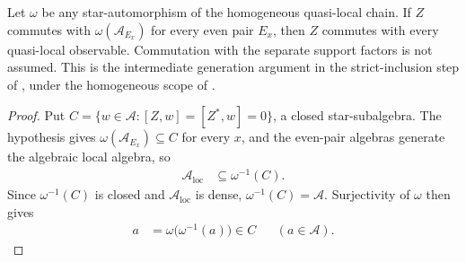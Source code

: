 \begin{lemma}
    \label{lem:qca_even_pair_image_commutant}
    \leanok
    Let $\omega$ be any star-automorphism of the homogeneous quasi-local
    chain. If $Z$ commutes with $\omega(\mathcal A_{E_x})$ for every even
    pair $E_x$, then $Z$ commutes with every quasi-local observable.
    Commutation with the separate support factors is not assumed.
    This is the intermediate generation argument in the strict-inclusion
    step of \cite[lines~1276--1287]{Gross2012IndexTheory}, under the
    homogeneous scope of
    \cite{gap:gnvw12_site_dependent_adjacent_generation_scope}.
\end{lemma}
\begin{proof}\leanok
    Put $C=\{w\in\mathcal A:[Z,w]=[Z^*,w]=0\}$, a closed star-subalgebra.
    The hypothesis gives $\omega(\mathcal A_{E_x})\subseteq C$ for every
    $x$, and the even-pair algebras generate the algebraic local algebra, so
    \begin{align}
        \mathcal A_{\mathrm{loc}}
         & \subseteq\omega^{-1}(C).
        \label{eq:qca_even_pair_image_commutant_local}
    \end{align}
    Since $\omega^{-1}(C)$ is closed and $\mathcal A_{\mathrm{loc}}$ is
    dense, $\omega^{-1}(C)=\mathcal A$. Surjectivity of $\omega$ then gives
    \begin{align}
        a
         & =\omega\bigl(\omega^{-1}(a)\bigr)\in C
         &                                        & (a\in\mathcal A).
        \label{eq:qca_even_pair_image_commutant_all}
    \end{align}
\end{proof}

